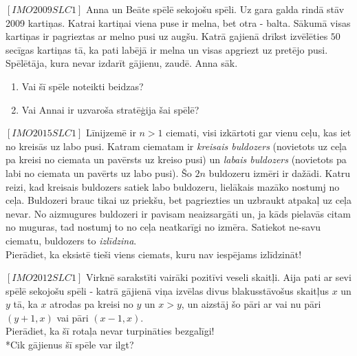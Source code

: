 



\renewcommand{\theenumi}{\alph{enumi}}



\noindent 

\begin{problem}
$[IMO2009SLC1]$
Anna un Beāte spēlē sekojošu spēli. Uz gara galda rindā stāv 2009 kartiņas. Katrai kartiņai viena puse ir melna, bet otra - balta. Sākumā visas kartiņas ir pagrieztas ar melno pusi uz augšu. Katrā gajienā drīkst izvēlēties $50$ secīgas kartiņas tā, ka pati labējā ir melna un visas apgriezt uz pretējo pusi. Spēlētāja, kura nevar izdarīt gājienu, zaudē. Anna sāk. 

\begin{enumerate}
\item Vai šī spēle noteikti beidzas?
\item Vai Annai ir uzvaroša stratēģija šai spēlē?
\end{enumerate}

\end{problem}

\begin{problem}
$[IMO2015SLC1]$
Līnijzemē ir $n>1$ ciemati, visi izkārtoti gar vienu ceļu, kas iet no kreisās uz labo pusi. Katram ciematam ir \textit{kreisais buldozers} (novietots uz ceļa pa kreisi no ciemata un pavērsts uz kreiso pusi) un \textit{labais buldozers} (novietots pa labi no ciemata un pavērts uz labo pusi). Šo $2n$ buldozeru izmēri ir dažādi. Katru reizi, kad kreisais buldozers satiek labo buldozeru, lielākais mazāko nostumj no ceļa. Buldozeri brauc tikai uz priekšu, bet pagriezties un uzbraukt atpakaļ uz ceļa nevar. No aizmugures buldozeri ir pavisam neaizsargāti un, ja kāds pielavās citam no muguras, tad nostumj to no ceļa neatkarīgi no izmēra. Satiekot ne-savu ciematu, buldozers to \textit{izlīdzina}. \\
Pierādiet, ka eksistē tieši viens ciemats, kuru nav iespējams izlīdzināt!
\end{problem}

\begin{problem}
$[IMO2012SLC1]$
Virknē sarakstīti vairāki pozitīvi veseli skaitļi. Aija pati ar sevi spēlē sekojošu spēli - katrā gājienā viņa izvēlas divus blakusstāvošus skaitļus $x$ un $y$ tā, ka $x$ atrodas pa kreisi no $y$ un $x>y$, un aizstāj šo pāri ar vai nu pāri $(y+1,x)$ vai pāri $(x-1,x)$. \\
Pierādiet, ka šī rotaļa nevar turpināties bezgalīgi!\\
*Cik gājienus šī spēle var ilgt?
\end{problem}



